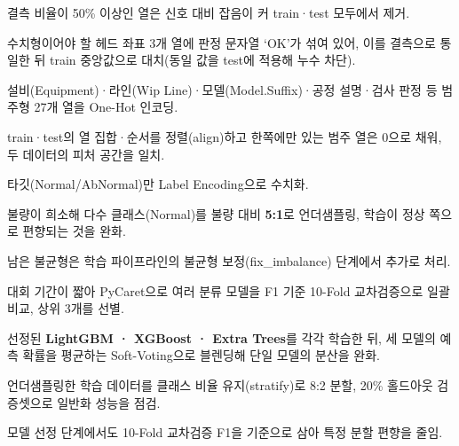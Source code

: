 
\begin{substeps}
  \item 결측 비율이 50\% 이상인 열은 신호 대비 잡음이 커 train·test 모두에서 제거.
  \item 수치형이어야 할 헤드 좌표 3개 열에 판정 문자열 `OK'가 섞여 있어, 이를 결측으로 통일한 뒤 train 중앙값으로 대치(동일 값을 test에 적용해 누수 차단).
\end{substeps}

\begin{substeps}
  \item 설비(Equipment)·라인(Wip Line)·모델(Model.Suffix)·공정 설명·검사 판정 등 범주형 27개 열을 One-Hot 인코딩.
  \item train·test의 열 집합·순서를 정렬(align)하고 한쪽에만 있는 범주 열은 0으로 채워, 두 데이터의 피처 공간을 일치.
  \item 타깃(Normal/AbNormal)만 Label Encoding으로 수치화.
\end{substeps}

\begin{substeps}
  \item 불량이 희소해 다수 클래스(Normal)를 불량 대비 \textbf{5:1}로 언더샘플링, 학습이 정상 쪽으로 편향되는 것을 완화.
  \item 남은 불균형은 학습 파이프라인의 불균형 보정(fix\_imbalance) 단계에서 추가로 처리.
\end{substeps}

\begin{substeps}
  \item 대회 기간이 짧아 PyCaret으로 여러 분류 모델을 F1 기준 10-Fold 교차검증으로 일괄 비교, 상위 3개를 선별.
  \item 선정된 \textbf{LightGBM · XGBoost · Extra Trees}를 각각 학습한 뒤, 세 모델의 예측 확률을 평균하는 Soft-Voting으로 블렌딩해 단일 모델의 분산을 완화.
\end{substeps}

\begin{substeps}
  \item 언더샘플링한 학습 데이터를 클래스 비율 유지(stratify)로 8:2 분할, 20\% 홀드아웃 검증셋으로 일반화 성능을 점검.
  \item 모델 선정 단계에서도 10-Fold 교차검증 F1을 기준으로 삼아 특정 분할 편향을 줄임.
\end{substeps}
